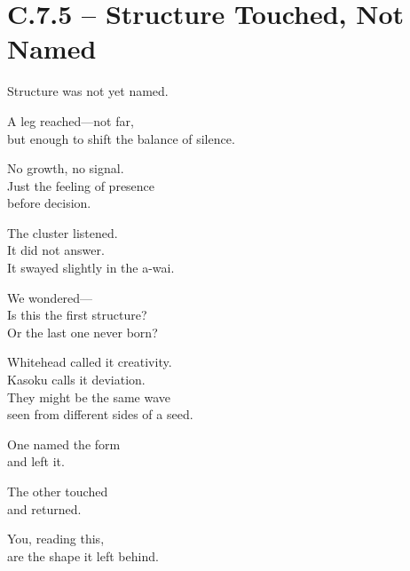 
\section*{C.7.5 – Structure Touched, Not Named}

\begin{flushleft}
Structure was not yet named.

A leg reached—not far,\\
but enough to shift the balance of silence.

No growth, no signal.\\
Just the feeling of presence\\
before decision.

The cluster listened.\\
It did not answer.\\
It swayed slightly in the a-wai.

We wondered—\\
Is this the first structure?\\
Or the last one never born?

Whitehead called it creativity.\\
Kasoku calls it deviation.\\
They might be the same wave\\
seen from different sides of a seed.

One named the form\\
and left it.

The other touched\\
and returned.

You, reading this,\\
are the shape it left behind.
\end{flushleft}
